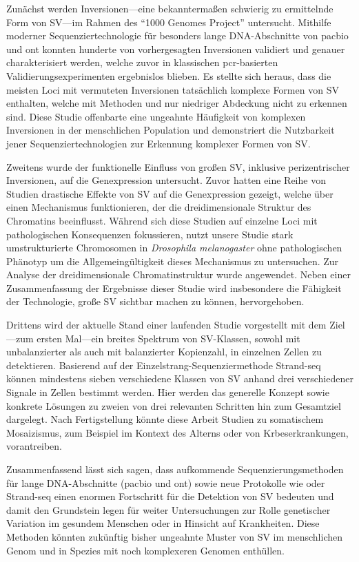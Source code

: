Zunächst werden Inversionen---eine bekanntermaßen schwierig zu ermittelnde Form
von SV---im Rahmen des ``1000 Genomes Project'' untersucht. Mithilfe moderner
Sequenziertechnologie für besonders lange DNA\--Ab\-schnit\-te von \acl{pacbio}
und \acl{ont} konnten hunderte von vor\-her\-ge\-sag\-ten Inversionen validiert und
genauer cha\-rak\-te\-ri\-siert werden, welche zuvor in klassischen \acs{pcr}-basierten
Validierungsexperimenten ergebnislos blieben. Es stellte sich heraus, dass die
meis\-ten Loci mit vermuteten Inversionen tatsächlich komplexe Formen von SV
enthalten, welche mit \mps Methoden und nur niedriger Abdeckung nicht zu
erkennen sind. Diese Studie offenbarte eine ungeahnte Häufigkeit von komplexen
Inversionen in der menschlichen Population und demonstriert die Nutzbarkeit
jener Sequenziertechnologien zur Erkennung komplexer Formen von SV.

Zweitens wurde der funktionelle Einfluss von großen SV,
inklusive perizentrischer Inversionen, auf die Genexpression untersucht.
Zuvor hatten eine Reihe von Studien drastische Effekte von SV auf die
Genexpression gezeigt, welche über einen Mechanismus funktionieren, der die
dreidimensionale Struktur des Chromatins beeinflusst. Während sich diese Studien
auf einzelne Loci mit pathologischen Konsequenzen fokussieren, nutzt unsere
Studie stark umstrukturierte Chromosomen in \textit{Drosophila melanogaster}
ohne pathologischen Phänotyp um die Allgemeingültigkeit dieses Mechanismus zu
untersuchen. Zur Analyse der dreidimensionale Chromatinstruktur wurde \hic
angewendet. Neben einer Zusammenfassung der Ergebnisse dieser Studie wird
insbesondere die Fähigkeit der \hic Technologie, große SV sichtbar machen zu
können, hervorgehoben.

Drittens wird der aktuelle Stand einer laufenden Studie vorgestellt mit dem
Ziel---zum ersten Mal---ein breites Spektrum von SV-Klassen, sowohl mit unbalanzierter
als auch mit balanzierter Kopienzahl, in einzelnen Zellen zu detektieren.
Basierend auf der Ein\-zel\-strang-Se\-quen\-zier\-me\-tho\-de Strand-seq können
mindestens sieben verschiedene Klas\-sen von SV anhand drei verschiedener Signale
in Zellen bestimmt werden. Hier werden das generelle Konzept sowie
konkrete Lösungen zu zweien von drei relevanten Schritten hin zum Gesamtziel
dargelegt. Nach Fertigstellung könnte diese Arbeit Studien zu somatischem
Mosaizismus, zum Beispiel im Kontext des Alterns oder von Krbeserkrankungen,
vorantreiben.

Zusammenfassend lässt sich sagen, dass aufkommende Sequenzierungsmethoden für
lange DNA-Ab\-schnit\-te (\acl{pacbio} und \acl{ont}) sowie neue Protokolle wie
\hic oder Strand-seq einen enormen Fortschritt für die Detektion von SV bedeuten
und damit den Grundstein legen für weiter Untersuchungen zur Rolle genetischer
Variation im gesundem Menschen oder in Hinsicht auf Krankheiten.  Diese Methoden könnten
zukünftig bisher ungeahnte Muster von SV im menschlichen Genom und in Spezies
mit noch komplexeren Genomen enthüllen.
